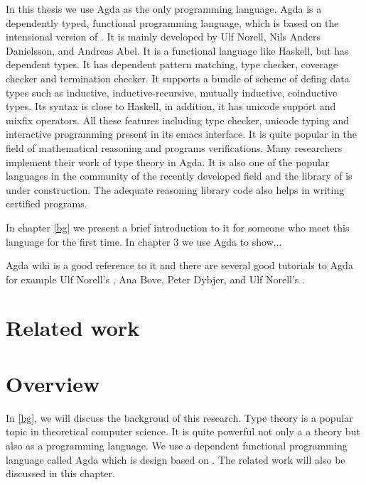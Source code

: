 In this thesis we use Agda as the only programming language. Agda is a dependently typed, functional programming language, which is
based on the intensional version of \mltt. It is mainly developed by
Ulf Norell, Nils Anders Danielsson, and Andreas Abel.
It is a functional language like Haskell, but has dependent types. It has dependent pattern
matching, type checker, coverage checker and termination checker. It
supports a bundle of scheme of defing data types such as inductive, inductive-recursive, mutually inductive,
coinductive types. Its syntax is close to Haskell, in addition, it has
unicode support and mixfix operators. All these features including
type checker, unicode typing and interactive programming present in
its emacs interface. It is quite popular in the field of mathematical reasoning and programs
verifications. Many researchers implement their work of type theory in
Agda. It is also one of the popular languages in the community of the recently
developed field \hott and the library of \hott is under construction.
The adequate reasoning library code also helps in writing certified programs.

In chapter \ref{bg} we present a brief introduction to it for someone
who meet this language for the first time. In chapter 3 we use Agda to
show...

Agda wiki\cite{agdawiki:main} is a good reference to it and there are
several good tutorials to Agda for example Ulf Norell's
\cite{tutorial}, Ana Bove, Peter Dybjer, and Ulf Norell's \cite{bove2009brief}.

\section{Related work}


\section{Overview}





In \autoref{bg}, we will discuss the backgroud of this research. Type theory is a popular topic in
theoretical computer science. It is quite powerful not only a a theory
but also as a programming language. We use a dependent functional
programming language called Agda which is design based on \mltt. The
 related work will also be discussed in this chapter.


